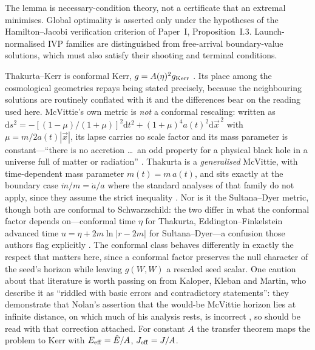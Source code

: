 \documentclass[12pt]{iopart}
\theoremstyle{plain}
\theoremstyle{definition}
\theoremstyle{remark}
\newcommand{\Ehat}{\hat E}
\newcommand{\dd}{\mathrm{d}}
\begin{document}
The lemma is necessary-condition theory, not a certificate that an
extremal minimises. Global optimality is asserted only under the
hypotheses of the Hamilton--Jacobi verification criterion of Paper~I,
Proposition~I.3. Launch-normalised IVP families are distinguished from
free-arrival boundary-value solutions, which must also satisfy their
shooting and terminal conditions.

Thakurta--Kerr is conformal Kerr, $g=A(\eta)^2 g_{\rm Kerr}$
\cite{Thakurta1981,Kerr1963}. Its place among the cosmological
geometries repays being stated precisely, because the neighbouring solutions are
routinely conflated with it and the differences bear on the reading used here.
McVittie's own metric is \emph{not} a conformal rescaling: written as
$\dd s^2=-[(1-\mu)/(1+\mu)]^2\dd t^2+(1+\mu)^4a(t)^2\dd\vec x^{\,2}$ with
$\mu=m/2a(t)|\vec x|$, its lapse carries no scale factor and its mass parameter is
constant---``there is no accretion \dots\ an odd property for a physical black hole
in a universe full of matter or radiation'' \cite[\S I]{Kaloper2010}. Thakurta is a
\emph{generalised} McVittie, with time-dependent mass parameter $m(t)=m\,a(t)$, and
sits exactly at the boundary case $\dot m/m=\dot a/a$ where the standard analyses of
that family do not apply, since they assume the strict inequality
\cite[\S II\,A]{MelloMaciel2017}. Nor is it the Sultana--Dyer metric, though both
are conformal to Schwarzschild: the two differ in what the conformal factor depends
on---conformal time $\eta$ for Thakurta, Eddington--Finkelstein advanced time
$u=\eta+2m\ln|r-2m|$ for Sultana--Dyer---a confusion those authors flag explicitly
\cite[\S II\,A]{MelloMaciel2017}. The conformal class behaves differently in exactly the
respect that matters here, since a conformal factor preserves the null character of
the seed's horizon while leaving $g(W,W)$ a rescaled seed scalar. One caution about
that literature is worth passing on from Kaloper, Kleban and Martin, who describe it
as ``riddled with basic errors and contradictory statements'': they demonstrate that
Nolan's assertion that the would-be McVittie horizon lies at infinite distance, on
which much of his analysis rests, is incorrect \cite[\S I]{Kaloper2010}, so
\cite{NolanMcVittie1998} should be read with that correction attached.
For constant $A$
the transfer theorem maps the problem to Kerr with $E_{\rm eff}=\Ehat/A$,
$J_{\rm eff}=J/A$.
\end{document}
